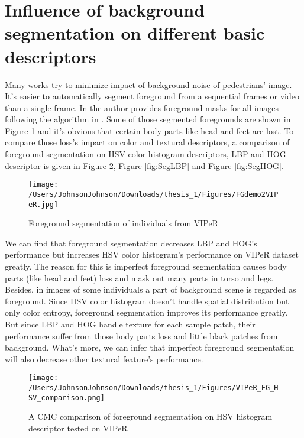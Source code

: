 \section{Influence of background segmentation on different basic descriptors}
Many works try to minimize impact of background noise of pedestrians' image. It's easier to automatically segment foreground from a sequential frames or video than a single frame. In \cite{SDALF} the author provides foreground masks for all images following the algorithm in \cite{STEL}.  Some of those segmented foregrounds are shown in Figure \ref{VIPeRFGs} and it's obvious that certain body parts like head and feet are lost. To compare those loss's impact on color and textural descriptors, a comparison of foreground segmentation on HSV color histogram descriptors, LBP and HOG descriptor is given in Figure \ref{fig:SegHSV}, Figure \ref{fig:SegLBP} and Figure \ref{fig:SegHOG}. 


\begin{figure}[H]
\centering
\texttt{[image: /Users/JohnsonJohnson/Downloads/thesis\_1/Figures/FGdemo2VIPeR.jpg]}
\caption{Foreground segmentation of individuals from VIPeR }
\label{VIPeRFGs}
\vspace{0em}
\end{figure} 

We can find that foreground segmentation decreases LBP and HOG's performance but increases HSV color histogram's performance on VIPeR dataset greatly. The reason for this is imperfect foreground segmentation causes body parts (like head and feet) loss and mask out many parts in torso and legs. Besides, in images of some individuals a part of background scene is regarded as foreground. Since HSV color histogram doesn't handle spatial distribution but only color entropy, foreground segmentation improves its performance greatly. But since LBP and HOG handle texture for each sample patch, their performance suffer from those body parts loss and little black patches from background. What's more, we can infer that imperfect foreground segmentation will also decrease other textural feature's performance.
\begin{figure}[H]
\centering
\texttt{[image: /Users/JohnsonJohnson/Downloads/thesis\_1/Figures/VIPeR\_FG\_HSV\_comparison.png]}
\caption{A CMC comparison of foreground segmentation on HSV histogram descriptor tested on VIPeR}
\label{fig:SegHSV}
\vspace{-1em}
\end{figure} 

